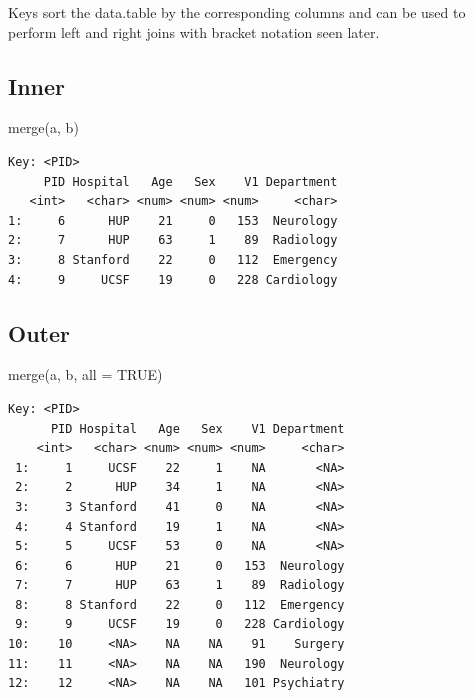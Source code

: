 \documentclass[
]{book}
\newenvironment{Shaded}{\begin{snugshade}}{\end{snugshade}}
\newcommand{\AttributeTok}[1]{\textcolor[rgb]{0.77,0.63,0.00}{#1}}
\newcommand{\ConstantTok}[1]{\textcolor[rgb]{0.00,0.00,0.00}{#1}}
\newcommand{\FunctionTok}[1]{\textcolor[rgb]{0.00,0.00,0.00}{#1}}
\newcommand{\NormalTok}[1]{#1}
\begin{document}
Keys sort the data.table by the corresponding columns and can be used to perform left and right joins with bracket notation seen later.

\hypertarget{inner}{%
\subsection{Inner}\label{inner}}

\begin{Shaded}
\begin{Highlighting}[]
\FunctionTok{merge}\NormalTok{(a, b)}
\end{Highlighting}
\end{Shaded}

\begin{verbatim}
Key: <PID>
     PID Hospital   Age   Sex    V1 Department
   <int>   <char> <num> <num> <num>     <char>
1:     6      HUP    21     0   153  Neurology
2:     7      HUP    63     1    89  Radiology
3:     8 Stanford    22     0   112  Emergency
4:     9     UCSF    19     0   228 Cardiology
\end{verbatim}

\hypertarget{outer}{%
\subsection{Outer}\label{outer}}

\begin{Shaded}
\begin{Highlighting}[]
\FunctionTok{merge}\NormalTok{(a, b, }\AttributeTok{all =} \ConstantTok{TRUE}\NormalTok{)}
\end{Highlighting}
\end{Shaded}

\begin{verbatim}
Key: <PID>
      PID Hospital   Age   Sex    V1 Department
    <int>   <char> <num> <num> <num>     <char>
 1:     1     UCSF    22     1    NA       <NA>
 2:     2      HUP    34     1    NA       <NA>
 3:     3 Stanford    41     0    NA       <NA>
 4:     4 Stanford    19     1    NA       <NA>
 5:     5     UCSF    53     0    NA       <NA>
 6:     6      HUP    21     0   153  Neurology
 7:     7      HUP    63     1    89  Radiology
 8:     8 Stanford    22     0   112  Emergency
 9:     9     UCSF    19     0   228 Cardiology
10:    10     <NA>    NA    NA    91    Surgery
11:    11     <NA>    NA    NA   190  Neurology
12:    12     <NA>    NA    NA   101 Psychiatry
\end{verbatim}
\end{document}

